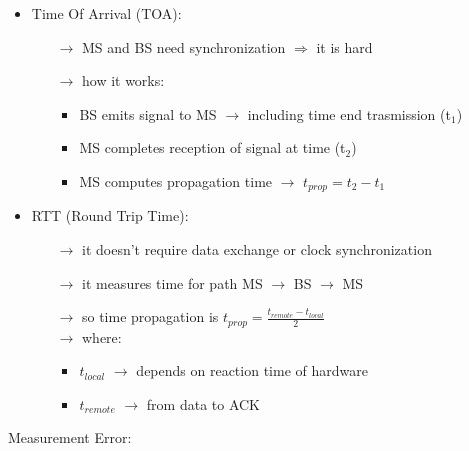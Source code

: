 \begin{itemize}
    \item Time Of Arrival (TOA):
    \begin{itemize}
        \item[$\rightarrow$] MS and BS need synchronization $\Rightarrow$ it is hard
        \item[$\rightarrow$] how it works:
        \begin{itemize}
            \item BS emits signal to MS $\rightarrow$ including time end trasmission (t$_\text{1}$)
            \item MS completes reception of signal at time (t$_\text{2}$)
            \item MS computes propagation time $\rightarrow$ $t_{prop} = t_2 - t_1$
        \end{itemize}
    \end{itemize}
    \item RTT (Round Trip Time):
    \begin{itemize}
        \item[$\rightarrow$] it doesn't require data exchange or clock synchronization
        \item[$\rightarrow$] it measures time for path MS $\rightarrow$ BS $\rightarrow$ MS
        \item[$\rightarrow$] so time propagation is $t_{prop} = \frac{t_{remote} - t_{local}}{2}$\\[0.15cm]
        $\rightarrow$ where:
        \begin{itemize}
            \item $t_{local}$ $\rightarrow$ depends on reaction time of hardware
            \item $t_{remote}$ $\rightarrow$ from data to ACK
        \end{itemize}
    \end{itemize}
\end{itemize}
\vspace*{0.3cm}
Measurement Error:
